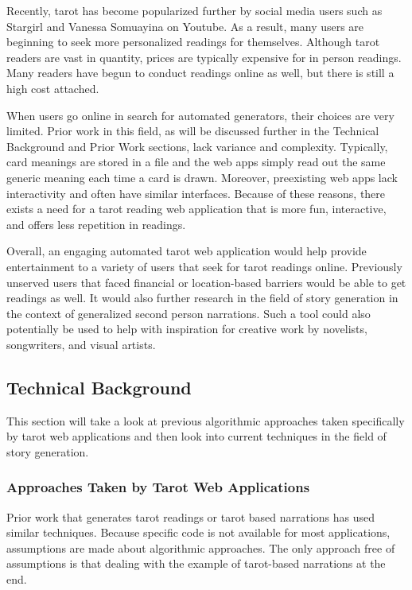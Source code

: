 \documentclass[10pt,twocolumn]{article}
\begin{document}
Recently, tarot has become popularized further by social media users such as Stargirl\cite{youtube2} and Vanessa Somuayina\cite{youtube} on Youtube. As a result, many users are beginning to seek more personalized readings for themselves. Although tarot readers are vast in quantity, prices are typically expensive for in person readings. Many readers have begun to conduct readings online as well, but there is still a high cost attached. 

When users go online in search for automated generators, their choices are very limited. Prior work in this field, as will be discussed further in the Technical Background and Prior Work sections, lack variance and complexity. Typically, card meanings are stored in a file and the web apps simply read out the same generic meaning each time a card is drawn. Moreover, preexisting web apps lack interactivity and often have similar interfaces. Because of these reasons, there exists a need for a tarot reading web application that is more fun, interactive, and offers less repetition in readings. 

Overall, an engaging automated tarot web application would help provide entertainment to a variety of users that seek for tarot readings online. Previously unserved users that faced financial or location-based barriers would be able to get readings as well. It would also further research in the field of story generation in the context of generalized second person narrations. Such a tool could also potentially be used to help with inspiration for creative work by novelists, songwriters, and visual artists.

\subsection{Technical Background}
This section will take a look at previous algorithmic approaches taken specifically by tarot web applications and then look into current techniques in the field of story generation.
\subsubsection{Approaches Taken by Tarot Web Applications}

Prior work that generates tarot readings or tarot based narrations has used similar techniques. Because specific code is not available for most applications, assumptions are made about algorithmic approaches. The only approach free of assumptions is that dealing with the example of tarot-based narrations at the end.
\end{document}
